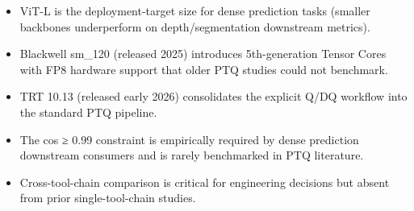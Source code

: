 \documentclass[
]{article}
\providecommand{\tightlist}{%
  \setlength{\itemsep}{0pt}\setlength{\parskip}{0pt}}
\begin{document}
\begin{itemize}
\tightlist
\item
  ViT-L is the deployment-target size for dense prediction tasks
  (smaller backbones underperform on depth/segmentation downstream
  metrics).
\item
  Blackwell sm\_120 (released 2025) introduces 5th-generation Tensor
  Cores with FP8 hardware support that older PTQ studies could not
  benchmark.
\item
  TRT 10.13 (released early 2026) consolidates the explicit Q/DQ
  workflow into the standard PTQ pipeline.
\item
  The cos ≥ 0.99 constraint is empirically required by dense prediction
  downstream consumers and is rarely benchmarked in PTQ literature.
\item
  Cross-tool-chain comparison is critical for engineering decisions but
  absent from prior single-tool-chain studies.
\end{itemize}
\end{document}
